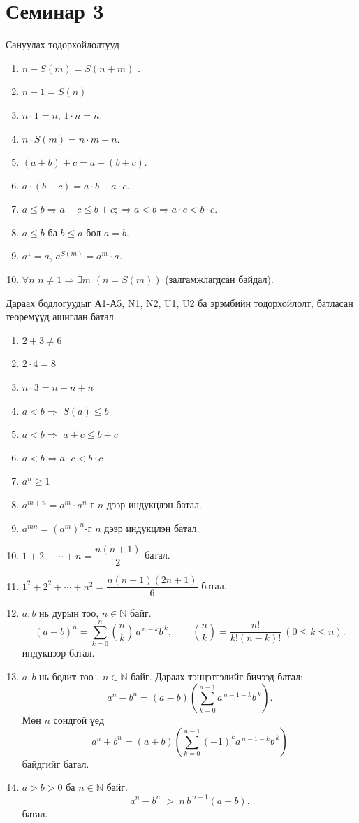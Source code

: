 \section{Семинар 3}
Сануулах тодорхойлолтууд
\begin{enumerate}
  \item $n+S(m)=S(n+m)$ .
  \item $n+1=S(n)$
  \item $n\cdot 1=n$, $1\cdot n=n$.
  \item $n\cdot S(m)=n\cdot m+n$.
  \item $(a+b)+c=a+(b+c)$.
  \item $a\cdot(b+c)=a\cdot b+a\cdot c$.
  \item $a\le b\Rightarrow a+c\le b+c; \Rightarrow a<b\Rightarrow a\cdot c<b\cdot c$.
  \item $a\leq b$ ба $b\leq a$ бол $a=b$.
  \item $a^1=a$, $a^{S(m)}=a^m\cdot a$.
  \item $\forall n\,\, n\ne 1\Rightarrow\exists m\,\,(n=S(m))$ (залгамжлагдсан байдал).
  \end{enumerate}
  
  Дараах бодлогуудыг А1-А5, N1, N2, U1, U2 ба эрэмбийн тодорхойлолт, батласан теоремүүд ашиглан батал.
  \begin{enumerate}
  \item $2+3\neq 6$
  \item $2\cdot 4=8$
  \item $n\cdot 3=n+n+n$
  \item $a<b \Rightarrow$ $S(a)\leq b$
  \item $a<b \Rightarrow$ $a+c\leq b+c$
  \item $a<b\Leftrightarrow a\cdot c< b\cdot c$
  \item $a^n\geq 1$ 
  \item $a^{m+n}=a^m\cdot a^n$-г $n$ дээр индукцлэн батал.
  \item $a^{mn}=(a^m)^n$-г $n$ дээр индукцлэн батал.
  \item $1+2+\cdots+n=\dfrac{n(n+1)}{2}$ батал. 
  \item $1^2+2^2+\cdots+n^2=\dfrac{n(n+1)(2n+1)}{6}$ батал. 
  \item $a,b$ нь дурын тоо, $n\in\mathbb{N}$ байг. 
\[
(a+b)^n=\sum_{k=0}^{n}\binom{n}{k}\,a^{\,n-k}b^{\,k},
\qquad
\binom{n}{k}=\frac{n!}{k!(n-k)!}\ (0\le k\le n).
\] индукцээр батал. 
  \item $a,b$ нь бодит тоо , $n\in\mathbb{N}$ байг. Дараах тэнцэтгэлийг бичээд батал:
\[
a^n-b^n=(a-b)(\sum_{k=0}^{n-1} a^{\,n-1-k} b^{\,k}).
\]
Мөн $n$ сондгой үед
\[
a^n+b^n=(a+b)(\sum_{k=0}^{n-1}(-1)^k a^{\,n-1-k} b^{\,k})
\]
байдгийг батал.
\item $a>b>0$ ба $n\in\mathbb{N}$ байг. 
\[
a^n-b^n \;>\; n\,b^{\,n-1}(a-b).
\]  батал.
\end{enumerate}
\newpage
